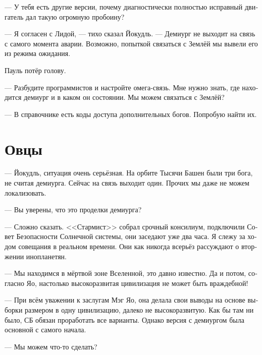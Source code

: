 \documentclass[a4paper,12pt,fleqn]{book}\usepackage{polyglossia}\setdefaultlanguage[babelshorthands=true]{russian}\setotherlanguage{english}\defaultfontfeatures{Ligatures=TeX,Mapping=tex-text}\usepackage{xcolor}\newcommand{\ml}[3]{#2}
\begin{document}
--- У тебя есть другие версии, почему диагностически полностью исправный двигатель дал такую огромную пробоину?

--- Я согласен с Лидой, --- тихо сказал Йокудль.
--- Демиург не выходит на связь с самого момента аварии.
Возможно, попыткой связаться с Землёй мы вывели его из режима ожидания.

Пауль потёр голову.

--- Разбудите программистов и настройте омега-связь.
Мне нужно знать, где находится демиург и в каком он состоянии.
Мы можем связаться с Землёй?

--- В справочнике есть коды доступа дополнительных богов.
Попробую найти их.

\section{Овцы}

--- Йокудль, ситуация очень серьёзная.
На орбите Тысячи Башен были три бога, не считая демиурга.
\ml{$0$}
{Сейчас на связь выходит один.}
{Now we can contact only one of them.}
\ml{$0$}
{Прочих мы даже не можем локализовать.}
{The others we can't even locate.''}

\ml{$0$}
{--- Вы уверены, что это проделки демиурга?}
{``Are you sure the demiurge has something to do with that?''}

\ml{$0$}
{--- Сложно сказать.}
{``We're not.}
\ml{$0$}
{<<Стармист>> собрал срочный консилиум, подключили Совет Безопасности Солнечной системы, они заседают уже два часа.}
{\textsc{Starmist} has summoned an emergency meeting, even Solar Security Council are invited, they've been in session for nearly two hours now.}
\ml{$0$}
{Я слежу за ходом совещания в реальном времени.}
{I'm following all proceedings of the meeting in real time.}
Они как никогда всерьёз рассуждают о вторжении инопланетян.

--- Мы находимся в мёртвой зоне Вселенной, это давно известно.
Да и потом, согласно Яо, настолько высокоразвитая цивилизация не может быть враждебной!

--- При всём уважении к заслугам Мэг Яо, она делала свои выводы на основе выборки размером в одну цивилизацию, далеко не высокоразвитую.
Как бы там ни было, СБ обязан проработать все варианты.
\ml{$0$}
{Однако версия с демиургом была основной с самого начала.}
{But interference of the demiurge was our best guess from the beginning.''}

\ml{$0$}
{--- Мы можем что-то сделать?}
{``What can we do?''}
\end{document}
